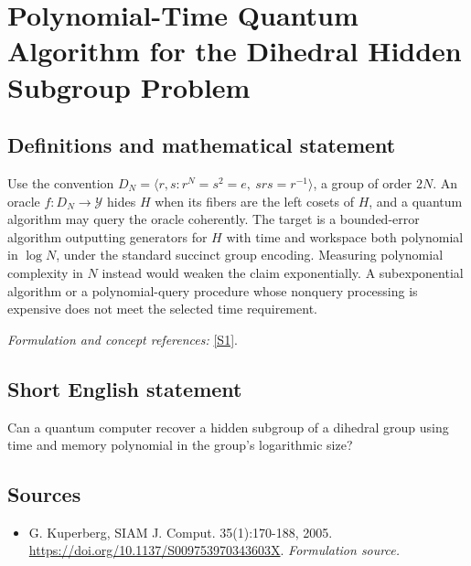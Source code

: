 \documentclass[11pt]{article}
\begin{document}
\section*{\texorpdfstring{Polynomial-Time Quantum Algorithm for the Dihedral Hidden Subgroup Problem}{Polynomial-Time Quantum Algorithm for the Dihedral Hidden Subgroup Problem}}\label{30006794}
\subsection{Definitions and mathematical statement}
Use the convention
$D_N=\langle r,s:r^N=s^2=e,\ srs=r^{-1}\rangle$, a group of order $2N$. An oracle $f:D_N\to\mathcal Y$ hides $H$ when its fibers are the left cosets of $H$, and a quantum algorithm may query the oracle coherently. The target is a bounded-error algorithm outputting generators for $H$ with time and workspace both polynomial in $\log N$, under the standard succinct group encoding. Measuring polynomial complexity in $N$ instead would weaken the claim exponentially. A subexponential algorithm or a polynomial-query procedure whose nonquery processing is expensive does not meet the selected time requirement.
\par\smallskip\textit{Formulation and concept references:} \href{https://doi.org/10.1137/S009753970343603X}{[S1]}.

\subsection{Short English statement}
Can a quantum computer recover a hidden subgroup of a dihedral group using time and memory polynomial in the group's logarithmic size?
\subsection{Sources}
\begin{itemize}
\item[S1]G. Kuperberg, SIAM J. Comput. 35(1):170-188, 2005.
\url{https://doi.org/10.1137/S009753970343603X}.
\textit{Formulation source.}
\end{itemize}
\end{document}
